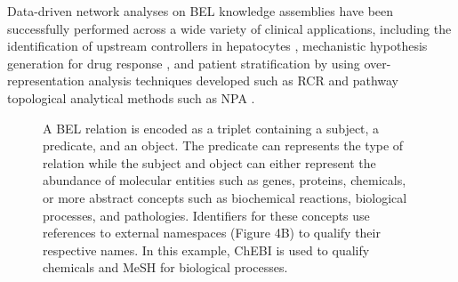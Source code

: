 Data-driven network analyses on \ac{BEL} knowledge assemblies have been successfully performed across a wide variety of clinical applications, including the identification of upstream controllers in hepatocytes \cite{Deehan2012}, mechanistic hypothesis generation for drug response \cite{Laifenfeld2014}, and patient stratification \cite{Laifenfeld2012} by using over-representation analysis techniques developed such as \ac{RCR} \cite{Catlett2013} and pathway topological analytical methods such as \ac{NPA} \cite{Martin2014}. 

\begin{figure}
\captionsetup{format=plain}
\caption[The Schema of a BEL Relation]{A BEL relation is encoded as a triplet containing a subject, a predicate, and an object. The predicate can represents the type of relation while the subject and object can either represent the abundance of molecular entities such as genes, proteins, chemicals, or more abstract concepts such as biochemical reactions, biological processes, and pathologies. Identifiers for these concepts use references to external namespaces (Figure 4B) to qualify their respective names. In this example, \ac{ChEBI} \cite{Hastings2013} is used to qualify chemicals and \ac{MeSH} \cite{ROGERS1963} for biological processes.}
\label{Fig:bel_relation}
\end{figure}

